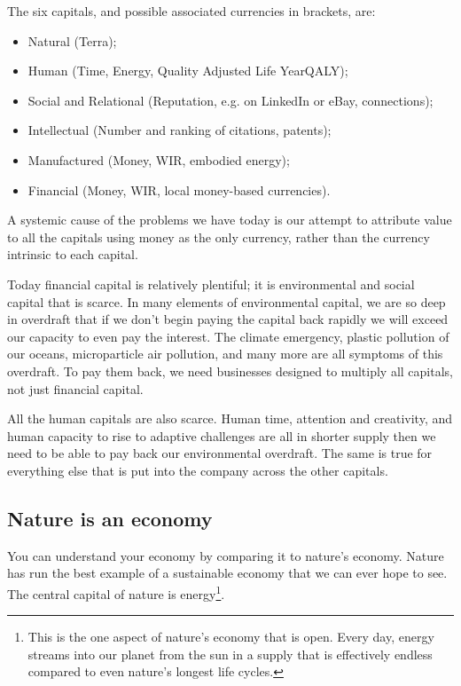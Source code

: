 The six capitals, and possible associated currencies in brackets, are:
 
\begin{itemize}
\item Natural (Terra);
        \item Human (Time, Energy, Quality Adjusted Life Year\textemdash QALY);
\item Social and Relational (Reputation, e.g. on LinkedIn or eBay, connections);
\item Intellectual (Number and ranking of citations, patents);
\item Manufactured (Money, WIR, embodied energy);
\item Financial (Money, WIR, local money-based currencies).
\end{itemize}


A systemic cause of the problems we have today is our attempt to attribute value to all the capitals using money as the only currency, rather than the currency intrinsic to each capital.


Today financial capital is relatively plentiful; it is environmental and social capital that is scarce. In many elements of environmental capital, we are so deep in overdraft that if we don't begin paying the capital back rapidly we will exceed our capacity to even pay the interest. The climate emergency, plastic pollution of our oceans, microparticle air pollution, and many more are all symptoms of this overdraft. To pay them back, we need businesses designed to multiply all capitals, not just financial capital.


All the human capitals are also scarce. Human time, attention and creativity, and human capacity to rise to adaptive challenges are all in shorter supply then we need to be able to pay back our environmental overdraft. The same is true for everything else that is put into the company across the other capitals.




\subsection{Nature is an economy}
You can understand your economy by comparing it to nature’s economy. Nature has run the best example of a sustainable economy that we can ever hope to see. The central capital of nature is energy\footnote{This is the one aspect of nature's economy that is open. Every day, energy streams into our planet from the sun in a supply that is effectively endless compared to even nature's longest life cycles.}. 


